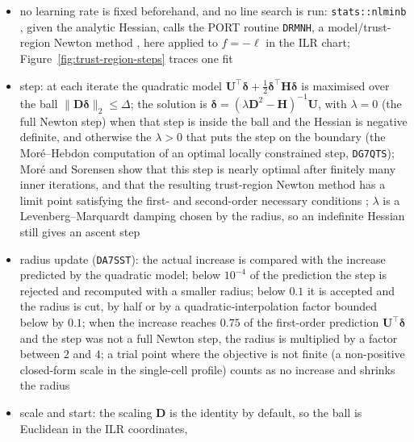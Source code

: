 \begin{remark}
  \label{rem:step-size}
  \begin{itemize}
    \item no learning rate is fixed beforehand, and no line search is run: \texttt{stats::nlminb} \cite{R-base}, given the analytic
          Hessian, calls the PORT routine \texttt{DRMNH}, a model/trust-region Newton method \cite{gayAlgorithm611Subroutines1983}, here applied to
          \(f=-\ell\) in the ILR chart; Figure~\ref{fig:trust-region-steps} traces one fit
    \item step: at each iterate the quadratic model \(\boldsymbol{U}^{\top}\boldsymbol{\delta}+\tfrac12\boldsymbol{\delta}^{\top}\boldsymbol{H}\boldsymbol{\delta}\) is maximised over the
          ball \(\lVert\boldsymbol{D}\boldsymbol{\delta}\rVert_{2}\le\Delta\); the solution is
          \(\boldsymbol{\delta}=(\lambda\boldsymbol{D}^{2}-\boldsymbol{H})^{-1}\boldsymbol{U}\), with \(\lambda=0\) (the full Newton step) when that step is inside
          the ball and the Hessian is negative definite, and otherwise the \(\lambda>0\) that puts the step on the boundary
          (the Moré--Hebdon computation of an optimal locally constrained step, \texttt{DG7QTS}); Moré and Sorensen
          show that this step is nearly optimal after finitely many inner iterations, and that the resulting trust-region
          Newton method has a limit point satisfying the first- and second-order necessary conditions
          \cite{moreComputingTrustRegion1983}; \(\lambda\) is a
          Levenberg--Marquardt damping chosen by the radius, so an indefinite Hessian still gives an ascent step
    \item radius update (\texttt{DA7SST}): the actual increase is compared with the increase predicted by the quadratic
          model; below \(10^{-4}\) of the prediction the step is rejected and recomputed with a smaller radius; below \(0.1\) it
          is accepted and the radius is cut, by half or by a quadratic-interpolation factor bounded below by \(0.1\); when
          the increase reaches \(0.75\) of the first-order prediction \(\boldsymbol{U}^{\top}\boldsymbol{\delta}\) and the step was not a full Newton
          step, the radius is multiplied by a factor between \(2\) and \(4\); a trial point where the objective is not finite (a non-positive closed-form scale in the
          single-cell profile) counts as no increase and shrinks the radius
    \item scale and start: the scaling \(\boldsymbol{D}\) is the identity by default, so the ball is Euclidean in the ILR coordinates,

\end{itemize}
\end{remark}
